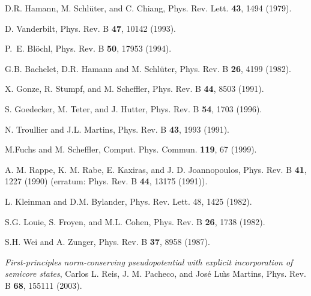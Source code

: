 \documentclass[12pt,a4paper]{article}
\begin{document}
\begin{thebibliography}{10}

D.R. Hamann, M. Schl\"uter, and C. Chiang, 
Phys. Rev. Lett. {\bf 43}, 1494 (1979).

 D. Vanderbilt, Phys. Rev. B  {\bf 47}, 10142 (1993).

 P.~E. Bl\"ochl, Phys. Rev. B {\bf 50}, 17953 (1994).

G.B. Bachelet, D.R. Hamann and M. Schl\"uter, Phys. Rev. B {\bf 26},
4199 (1982). 

X. Gonze, R. Stumpf, and M. Scheffler, Phys. Rev. B {\bf 44}, 8503 (1991).

S. Goedecker, M. Teter, and J. Hutter, Phys. Rev. B {\bf 54}, 1703 (1996).

 N. Troullier and J.L. Martins, Phys. Rev. B {\bf 43},
1993 (1991).

M.Fuchs and M. Scheffler, Comput. Phys. Commun. {\bf 119}, 67 (1999).

 A. M. Rappe, K. M. Rabe, E. Kaxiras, and J. D. Joannopoulos, 
Phys. Rev. B {\bf 41}, 1227 (1990) 
(erratum: Phys. Rev. B {\bf 44}, 13175 (1991)).

 L. Kleinman and D.M. Bylander, Phys. Rev. Lett. 48, 1425 (1982).

S.G. Louie, S. Froyen, and M.L. Cohen, Phys. Rev. B {\bf 26}, 1738 (1982).

 S.H. Wei and A. Zunger, Phys. Rev. B {\bf 37}, 8958 (1987).

 {\em First-principles norm-conserving pseudopotential with 
explicit incorporation of semicore states}, Carlos L. Reis, J. M. Pacheco, 
and Jos\'e Lu{\`\i}s Martins, Phys. Rev. B {\bf 68}, 155111 (2003).
\end{thebibliography}
\end{document}
